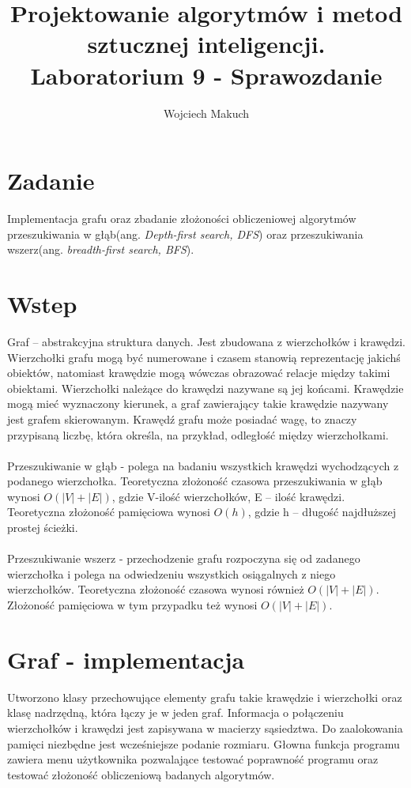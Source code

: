 
\title{Projektowanie algorytmów i metod sztucznej inteligencji. Laboratorium  9 - Sprawozdanie}
\author{Wojciech Makuch}
\date{}

%
	\maketitle
	\section{Zadanie}\label{sec:Zadanie}
	Implementacja grafu oraz zbadanie złożoności obliczeniowej algorytmów przeszukiwania w głąb(ang. \textsl{Depth-first search, DFS}) oraz przeszukiwania  wszerz(ang. \textsl{breadth-first search, BFS}).
	
	\section{Wstep}\label{sec:Wstep}
	Graf – abstrakcyjna struktura danych. Jest zbudowana z wierzchołków i krawędzi. Wierzchołki grafu mogą być numerowane i czasem stanowią reprezentację jakichś obiektów, natomiast krawędzie mogą wówczas obrazować relacje między takimi obiektami. Wierzchołki należące do krawędzi nazywane są jej końcami. Krawędzie mogą mieć wyznaczony kierunek, a graf zawierający takie krawędzie nazywany jest grafem skierowanym. Krawędź grafu może posiadać wagę, to znaczy przypisaną liczbę, która określa, na przykład, odległość między wierzchołkami.
	\\
	\\
	Przeszukiwanie w głąb - polega na badaniu wszystkich krawędzi wychodzących z podanego wierzchołka. Teoretyczna złożoność czasowa przeszukiwania w głąb wynosi $O(|V|+|E|)$, gdzie V-ilość wierzchołków, E – ilość krawędzi. Teoretyczna złożoność pamięciowa wynosi $O(h)$, gdzie h – długość najdłuższej prostej ścieżki.
	\\
	\\
	Przeszukiwanie wszerz - przechodzenie grafu rozpoczyna się od zadanego wierzchołka i polega na odwiedzeniu wszystkich osiągalnych z niego wierzchołków. Teoretyczna złożoność czasowa wynosi również $O(|V|+|E|)$. Złożoność pamięciowa w tym przypadku też wynosi $O(|V|+|E|)$.
	
	\section{Graf - implementacja}\label{sec:Graf - implementacja}
	Utworzono klasy przechowujące elementy grafu takie krawędzie i wierzchołki oraz klasę nadrzędną, która łączy je w jeden graf. Informacja o połączeniu wierzchołków i krawędzi jest zapisywana w macierzy sąsiedztwa. Do zaalokowania pamięci niezbędne jest wcześniejsze podanie rozmiaru. Głowna funkcja programu zawiera menu użytkownika pozwalające testować poprawność programu oraz testować złożoność obliczeniową badanych algorytmów.
	
